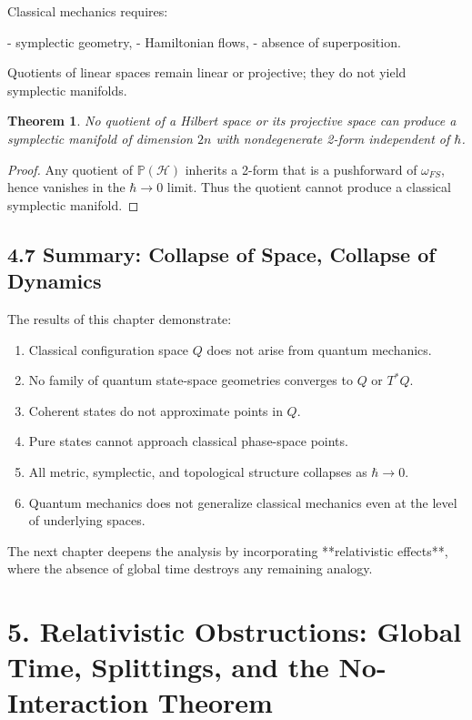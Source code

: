 \documentclass[12pt,oneside]{book}
\theoremstyle{plain}
\newtheorem{theorem}{Theorem}[chapter]
\theoremstyle{definition}
\begin{document}
Classical mechanics requires:

- symplectic geometry,
- Hamiltonian flows,
- absence of superposition.

Quotients of linear spaces remain linear or projective; they do not yield symplectic manifolds.

\begin{theorem}
No quotient of a Hilbert space or its projective space can produce a symplectic manifold of dimension $2n$ with nondegenerate 2-form independent of $\hbar$.
\end{theorem}

\begin{proof}
Any quotient of $\mathbb{P}(\mathcal{H})$ inherits a 2-form that is a pushforward of $\omega_{FS}$, hence vanishes in the $\hbar\to 0$ limit. 
Thus the quotient cannot produce a classical symplectic manifold.
\end{proof}

\section{4.7 Summary: Collapse of Space, Collapse of Dynamics}

The results of this chapter demonstrate:

\begin{enumerate}
\item Classical configuration space $Q$ does not arise from quantum mechanics.  
\item No family of quantum state-space geometries converges to $Q$ or $T^*Q$.  
\item Coherent states do not approximate points in $Q$.  
\item Pure states cannot approach classical phase-space points.  
\item All metric, symplectic, and topological structure collapses as $\hbar\to0$.  
\item Quantum mechanics does not generalize classical mechanics even at the level of underlying spaces.
\end{enumerate}

The next chapter deepens the analysis by incorporating **relativistic effects**, where the absence of global time destroys any remaining analogy.

\chapter{5. Relativistic Obstructions: Global Time, Splittings, and the No-Interaction Theorem}
\end{document}
